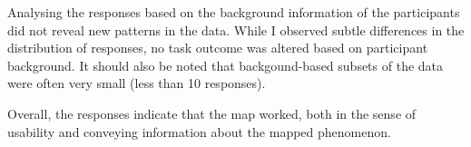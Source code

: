 Analysing the responses based on the background information of the participants
did not reveal new patterns in the data.
While I observed subtle differences in the distribution of responses,
no task outcome was altered based on participant background.
It should also be noted that
backgound-based subsets of the data were often very small (less than 10 responses).

Overall, the responses indicate that the map worked,
both in the sense of usability and conveying information about the mapped phenomenon.

